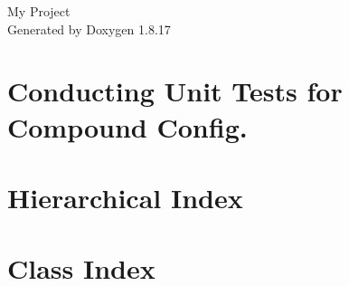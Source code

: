 \let\mypdfximage\pdfximage\def\pdfximage{\immediate\mypdfximage}\documentclass[twoside]{book}
\newcommand{\+}{\discretionary{\mbox{\scriptsize$\hookleftarrow$}}{}{}}
\newcommand{\clearemptydoublepage}{%
  \newpage{\pagestyle{empty}\cleardoublepage}%
}
\begin{document}
\hypersetup{pageanchor=false,
             bookmarksnumbered=true,
             pdfencoding=unicode
            }
\begin{titlepage}
\vspace*{7cm}
\begin{center}%
{\Large My Project }\\
\vspace*{1cm}
{\large Generated by Doxygen 1.8.17}\\
\end{center}
\end{titlepage}
\clearemptydoublepage
{}
\tableofcontents
\clearemptydoublepage
{}
\hypersetup{pageanchor=true}

\chapter{Conducting Unit Tests for Compound Config.}
\label{md_src_unit-tests_compound-config_README}

\chapter{Hierarchical Index}

\chapter{Class Index}

\end{document}
